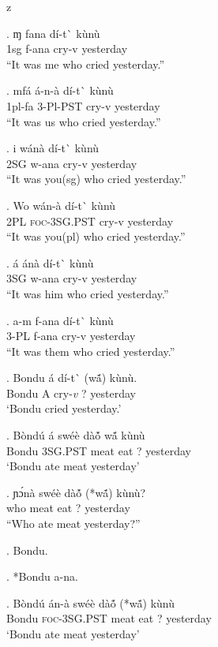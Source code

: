 z   \documentclass{assets/fieldnotes}
\begin{document}
\exg. ɱ fana dí-t\`{} kùnù\\
1sg f-ana cry-v yesterday\\
``It was me who cried yesterday.''

\exg. mfá á-n-à dí-t\`{} kùnù\\
1pl-fa 3-Pl-PST cry-v yesterday\\
``It was us who cried yesterday.''

\exg. i wánà dí-t\`{} kùnù\\
2SG w-ana cry-v yesterday\\
``It was you(sg) who cried yesterday.''

\exg. Wo wán-à dí-t\`{} kùnù\\
2PL \textsc{foc-3SG.PST} cry-v yesterday\\
``It was you(pl) who cried yesterday.''


\exg. á ánà dí-t\`{} kùnù\\
3SG w-ana cry-v yesterday\\
``It was him who cried yesterday.''

\exg. a-m f-ana dí-t\`{} kùnù\\
3-PL f-ana cry-v yesterday\\
``It was them who cried yesterday.''

\exg. Bondu \'{a} d\'{i}-t\`{} (wã́) k\`{u}n\`{u}. \\
Bondu A cry-\textit{v} ? yesterday \\
`Bondu cried yesterday.'


\exg. Bòndú á swéè dàó̃ wã́ kùnù\\
Bondu 3SG.PST meat eat ? yesterday \\%
    `Bondu ate meat yesterday'

\exg. ɲɔ́nà swéè dàó̃ (*wã́) kùnù?\\
who meat eat ? yesterday\\
``Who ate meat yesterday?''

\ex. Bondu.

\ex. *Bondu a-na.

\exg. Bòndú án-à swéè dàó̃ (*wã́) kùnù\\
Bondu \textsc{foc-3SG.PST} meat eat ? yesterday \\%
    `Bondu ate meat yesterday'\\
    
\end{document}
